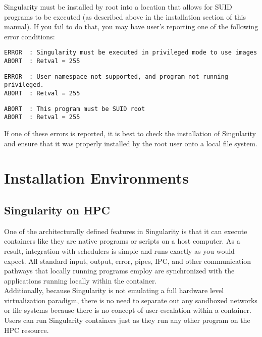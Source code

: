 \documentclass[a4paper]{article}
\begin{document}
Singularity must be installed by root into a location that allows for SUID programs to be executed (as described above in the installation section of this manual). If you fail to do that, you may have user’s reporting one of the following error conditions:\\[0.1in]

\begin{lstlisting}[frame=single]
ERROR  : Singularity must be executed in privileged mode to use images
ABORT  : Retval = 255
\end{lstlisting}
\begin{lstlisting}[frame=single]
ERROR  : User namespace not supported, and program not running privileged.
ABORT  : Retval = 255
\end{lstlisting}
\begin{lstlisting}[frame=single]
ABORT  : This program must be SUID root
ABORT  : Retval = 255
\end{lstlisting}

If one of these errors is reported, it is best to check the installation of Singularity and ensure that it was properly installed by the root user onto a local file system.

\section{Installation Environments}
\subsection{Singularity on HPC}

One of the architecturally defined features in Singularity is that it can execute containers like they are native programs or scripts on a host computer. As a result, integration with schedulers is simple and runs exactly as you would expect. All standard input, output, error, pipes, IPC, and other communication pathways that locally running programs employ are synchronized with the applications running locally within the container.\\[0.1in]

Additionally, because Singularity is not emulating a full hardware level virtualization paradigm, there is no need to separate out any sandboxed networks or file systems because there is no concept of user-escalation within a container. Users can run Singularity containers just as they run any other program on the HPC resource.\\[0.1in]
\end{document}
